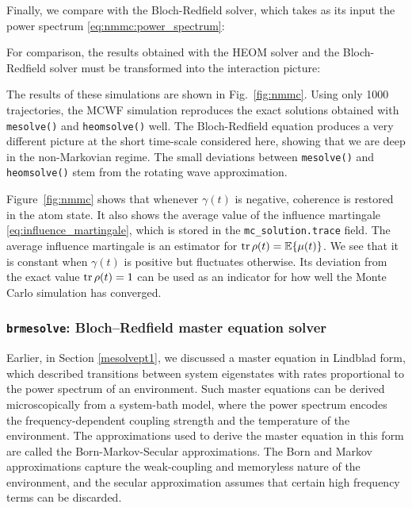 \documentclass[preprint,3p,sort&compress]{elsarticle}
\def\code#1{\texttt{#1}}
\begin{document}
Finally, we compare with the Bloch-Redfield solver, which takes as its input the power spectrum \eqref{eq:nmmc:power_spectrum}:

%
For comparison, the results obtained with the HEOM solver and the Bloch-Redfield solver must be transformed into the interaction picture:


The results of these simulations are shown in Fig.~\ref{fig:nmmc}.
Using only 1000 trajectories, the MCWF simulation reproduces the exact solutions obtained with \code{mesolve()} and \code{heomsolve()} well.
The Bloch-Redfield equation produces a very different picture at the short time-scale considered here, showing that we are deep in the non-Markovian regime.
The small deviations between \code{mesolve()} and \code{heomsolve()} stem from the rotating wave approximation.

Figure~\ref{fig:nmmc} shows that whenever $\gamma(t)$ is negative, coherence is restored in the atom state.
It also shows the average value of the influence martingale \eqref{eq:influence_martingale}, which is stored in the \code{mc\_solution.trace} field.
The average influence martingale is an estimator for $\tr \rho(t) = \mathbb E\{ \mu(t) \}$.
We see that it is constant when $\gamma(t)$ is positive but fluctuates otherwise.
Its deviation from the exact value $\tr \rho(t) = 1$ can be used as an indicator for how well the Monte Carlo simulation has converged.



\subsubsection{\textup{\code{brmesolve}}: Bloch--Redfield master equation solver}

Earlier, in Section \ref{mesolvept1}, we discussed a master equation in Lindblad form, which described transitions between system eigenstates with rates proportional to the power spectrum of an environment. Such master equations can be derived microscopically from a system-bath model, where the power spectrum encodes the frequency-dependent coupling strength and the temperature of the environment.  The approximations used to derive the master equation in this form are called the Born-Markov-Secular approximations.  The Born and Markov approximations capture the weak-coupling and memoryless nature of the environment, and the secular approximation assumes that certain high frequency terms can be discarded.  
\end{document}
